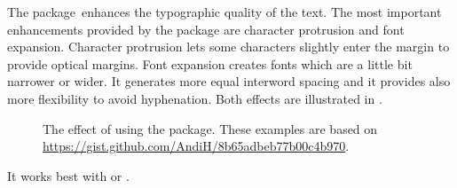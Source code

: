 The  package\,\cite{pkg:microtype} enhances the typographic
quality of the text. The most important enhancements provided by the package
are character protrusion and font expansion. Character protrusion lets some
characters slightly enter the margin to provide optical margins. Font expansion
creates fonts which are a little bit narrower or wider. It generates more equal
interword spacing and it provides also more flexibility to avoid hyphenation.
Both effects are illustrated in .
\begin{figure}
  \centering
  \setlength{\fboxsep}{9pt}
  \vspace{0pt}
  \par\bigskip
  \vspace{0pt}
  \caption[The effect of using the  package.]{The effect of
    using the  package. These examples are based on
    \url{https://gist.github.com/AndiH/8b65adbeb77b00c4b970}.}
  \label{fig:microtype}
\end{figure}
It works best with  or .

